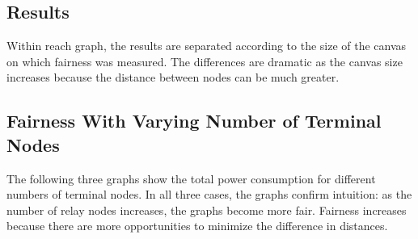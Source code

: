 \subsection{Results}

Within reach graph, the results are separated according to the size of the canvas on which fairness was measured.  The differences are dramatic as the canvas size increases because the distance between nodes can be much greater.

\subsection{Fairness With Varying Number of Terminal Nodes}

The following three graphs show the total power consumption for different numbers of terminal nodes.  In all three cases, the graphs confirm intuition: as the number of relay nodes increases, the graphs become more fair.  Fairness increases because there are more opportunities to minimize the difference in distances.

